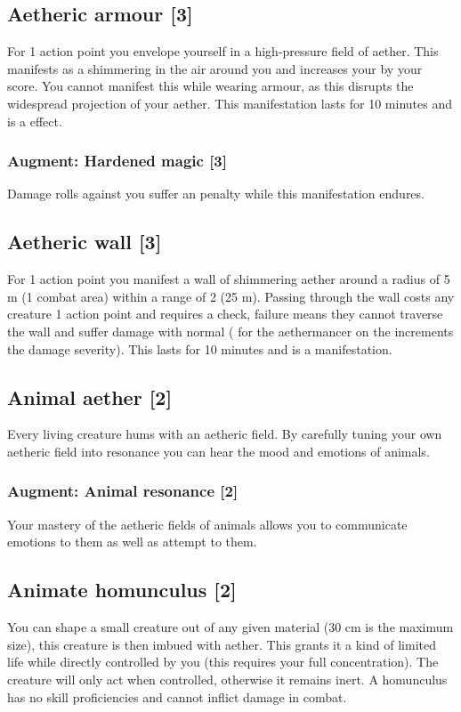 \subsection{Aetheric armour [3]}
\label{spell:arcane-armour}
For 1 action point you envelope yourself in a high-pressure field of aether. This manifests as a shimmering in the air around you and increases your  by your  score. You cannot manifest this while wearing armour, as this disrupts the widespread projection of your aether. This manifestation lasts for 10 minutes and is a  effect.
\subsubsection{Augment: Hardened magic [3]}
Damage rolls against you suffer an  penalty while this manifestation endures.


\subsection{Aetheric wall [3]}
For 1 action point you manifest a wall of shimmering aether around a radius of 5 m (1 combat area) within a range of 2 (25 m). Passing through the wall costs any creature 1 action point and requires a  check, failure means they cannot traverse the wall and suffer damage with normal  ( for the aethermancer on the  increments the damage severity). This lasts for 10 minutes and is a  manifestation.


\subsection{Animal aether [2]}
Every living creature hums with an aetheric field. By carefully tuning your own aetheric field into resonance you can hear the mood and emotions of animals.
\subsubsection{Augment: Animal resonance [2]}
Your mastery of the aetheric fields of animals allows you to communicate emotions to them as well as attempt to  them.


\subsection{Animate homunculus [2]}
You can shape a small creature out of any given material (30 cm is the maximum size), this creature is then imbued with aether. This grants it a kind of limited life while directly controlled by you (this requires your full concentration). The creature will only act when controlled, otherwise it remains inert. A homunculus has no skill proficiencies and cannot inflict damage in combat.
